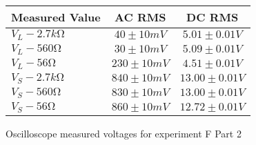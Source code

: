 \begin{figure}[H]    \centering    \begin{tabular}{|l|c|c|}
        \hline
        Measured Value & AC RMS & DC RMS \\
        \hline
        $V_{L} - 2.7\unit{k\ohm}$ & $40\pm 10\unit{mV}$ & $5.01\pm 0.01\unit{V}$ \\
        $V_{L} - 560\unit{\ohm}$ & $30\pm 10\unit{mV}$ & $5.09\pm 0.01\unit{V}$ \\
        $V_{L} - 56\unit{\ohm}$ & $230\pm 10\unit{mV}$ & $4.51\pm 0.01\unit{V}$ \\
        $V_{S} - 2.7\unit{k\ohm}$ & $840\pm 10\unit{mV}$ & $13.00\pm 0.01\unit{V}$ \\
        $V_{S} - 560\unit{\ohm}$ & $830\pm 10\unit{mV}$ & $13.00\pm 0.01\unit{V}$ \\
        $V_{S} - 56\unit{\ohm}$ & $860\pm 10\unit{mV}$ & $12.72\pm 0.01\unit{V}$ \\
        \hline
    \end{tabular}    \caption{Oscilloscope measured voltages for experiment F Part 2}\end{figure}
